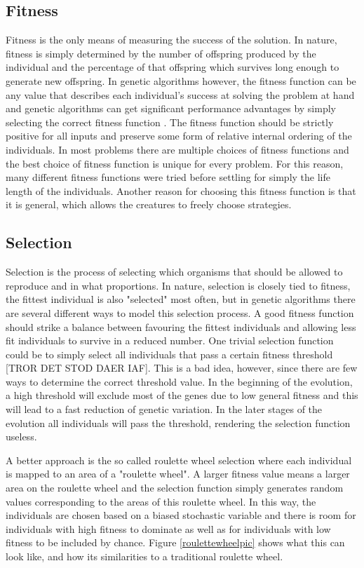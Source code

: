 \documentclass[a4paper,11pt]{kth-mag}
\begin{document}
\subsection{Fitness}
Fitness is the only means of measuring the success of the solution. In nature, fitness is simply determined by the number of offspring produced by the individual and the percentage of that offspring which survives long enough to generate new offspring. In genetic algorithms however, the fitness function can be any value that describes each individual's success at solving the problem at hand and genetic algorithms can get significant performance advantages by simply selecting the correct fitness function \cite{marsland}. The fitness function should be strictly positive for all inputs and preserve some form of relative internal ordering of the individuals. In most problems there are multiple choices of fitness functions and the best choice of fitness function is unique for every problem. For this reason, many different fitness functions were tried before settling for simply the life length of the individuals. Another reason for choosing this fitness function is that it is general, which allows the creatures to freely choose strategies.

\subsection{Selection}
Selection is the process of selecting which organisms that should be allowed to reproduce and in what proportions. In nature, selection is closely tied to fitness, the fittest individual is also "selected" most often, but in genetic algorithms there are several different ways to model this selection process. A good fitness function should strike a balance between favouring the fittest individuals and allowing less fit individuals to survive in a reduced number.  One trivial selection function could be to simply select all individuals that pass a certain fitness threshold \cite{marsland} [TROR DET STOD DAER IAF]. This is a bad idea, however, since there are few ways to determine the correct threshold value. In the beginning of the evolution, a high threshold will exclude most of the genes due to low general fitness and this will lead to a fast reduction of genetic variation. In the later stages of the evolution all individuals will pass the threshold, rendering the selection function useless.

A better approach is the so called roulette wheel selection where each individual is mapped to an area of a "roulette wheel". A larger fitness value means a larger area on the roulette wheel and the selection function simply generates random values corresponding to the areas of this roulette wheel. In this way, the individuals are chosen based on a biased stochastic variable and there is room for individuals with high fitness to dominate as well as for individuals with low fitness to be included by chance. Figure \ref{roulettewheelpic} shows what this can look like, and how its similarities to a traditional roulette wheel.
\end{document}
